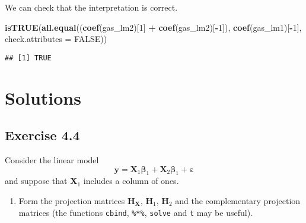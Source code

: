 \documentclass[]{book}
\newenvironment{Shaded}{\begin{snugshade}}{\end{snugshade}}
\newcommand{\DataTypeTok}[1]{\textcolor[rgb]{0.13,0.29,0.53}{#1}}
\newcommand{\DecValTok}[1]{\textcolor[rgb]{0.00,0.00,0.81}{#1}}
\newcommand{\KeywordTok}[1]{\textcolor[rgb]{0.13,0.29,0.53}{\textbf{#1}}}
\newcommand{\NormalTok}[1]{#1}
\newcommand{\OperatorTok}[1]{\textcolor[rgb]{0.81,0.36,0.00}{\textbf{#1}}}
\newcommand{\OtherTok}[1]{\textcolor[rgb]{0.56,0.35,0.01}{#1}}
\newcommand{\StringTok}[1]{\textcolor[rgb]{0.31,0.60,0.02}{#1}}
\providecommand{\tightlist}{%
  \setlength{\itemsep}{0pt}\setlength{\parskip}{0pt}}
\theoremstyle{definition}
\theoremstyle{definition}
\theoremstyle{definition}
\theoremstyle{remark}
\begin{document}
We can check that the interpretation is correct.

\begin{Shaded}
\begin{Highlighting}[]
\KeywordTok{isTRUE}\NormalTok{(}\KeywordTok{all.equal}\NormalTok{((}\KeywordTok{coef}\NormalTok{(gas_lm2)[}\DecValTok{1}\NormalTok{] }\OperatorTok{+}\StringTok{ }\KeywordTok{coef}\NormalTok{(gas_lm2)[}\OperatorTok{-}\DecValTok{1}\NormalTok{]), }
                 \KeywordTok{coef}\NormalTok{(gas_lm1)[}\OperatorTok{-}\DecValTok{1}\NormalTok{], }\DataTypeTok{check.attributes =} \OtherTok{FALSE}\NormalTok{))}
\end{Highlighting}
\end{Shaded}

\begin{verbatim}
## [1] TRUE
\end{verbatim}

\hypertarget{solutions-2}{%
\section{Solutions}\label{solutions-2}}

\hypertarget{exercise-4.4}{%
\subsection{Exercise 4.4}\label{exercise-4.4}}

Consider the linear model
\[\boldsymbol{y} = \mathbf{X}_1\boldsymbol{\beta}_1 +\mathbf{X}_2\boldsymbol{\beta}_1 + \boldsymbol{\varepsilon}\]
and suppose that \(\mathbf{X}_1\) includes a column of ones.

\begin{Shaded}
\end{Shaded}

\begin{enumerate}
\def\labelenumi{\alph{enumi}.}
\tightlist
\item
  Form the projection matrices \(\mathbf{H}_{\mathbf{X}}\),
  \(\mathbf{H}_{1}\), \(\mathbf{H}_{2}\) and the complementary
  projection matrices (the functions \texttt{cbind}, \texttt{\%*\%},
  \texttt{solve} and \texttt{t} may be useful).
\end{enumerate}
\end{document}
